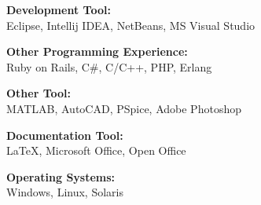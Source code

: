 \documentclass[10pt]{article}
\newcommand{\blankline}{\quad\pagebreak[2]}
\begin{document}
\blankline

{\textbf{Development Tool:}}\\
Eclipse, Intellij IDEA, NetBeans, MS Visual Studio

\blankline

{\textbf{Other Programming Experience:}}\\
Ruby on Rails, C\#, C/C++, PHP, Erlang

\blankline

{\textbf{Other Tool:}}\\
MATLAB, AutoCAD, PSpice, Adobe Photoshop

\blankline

{\textbf{Documentation Tool:}}\\ 
\LaTeX{}, Microsoft Office, Open Office

\blankline

{\textbf{Operating Systems:}}\\
Windows, Linux, Solaris

\newpage
\end{document}

